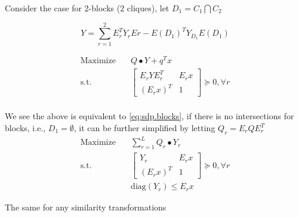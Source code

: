 \begin{frame}
  Consider the case for 2-blocks (2 cliques), let \(D_1 = C_1 \bigcap C_2\)

  \begin{equation}
    Y =  \sum_{r=1}^2 E_r^TY_r Er - E(D_1)^TY_{D_1}E(D_1)
  \end{equation}

  \begin{equation}
    \begin{aligned}
      \mathrm{Maximize}\quad & Q \bullet Y + q^Tx                               \\
      \mathrm{s.t.} \quad    & \begin{bmatrix}E_r Y E_r^T & E_rx \\ (E_rx)^T & 1\end{bmatrix}   \succeq 0, \forall r \\
    \end{aligned}
  \end{equation}

  We see the above is equivalent to \eqref{eq:sdp.blocks}, if there is no intersections for blocks, i.e., \(D_1 = \emptyset\),
  it can be further simplified by letting \(Q_r = E_r Q E_r^T\)
  \begin{equation}
    \begin{aligned}
      \mathrm{Maximize}\quad & \sum_{r=1}^L Q_r \bullet Y_r                     \\
      \mathrm{s.t.} \quad    & \begin{bmatrix}Y_r & E_rx \\ (E_rx)^T & 1\end{bmatrix}   \succeq 0, \forall r \\
                             & \mathrm{diag}(Y_r) \le E_r x
    \end{aligned}
  \end{equation}

  The same for any similarity transformations
\end{frame}
\begin{frame}
  \scriptsize
  \printbibliography
\end{frame}

